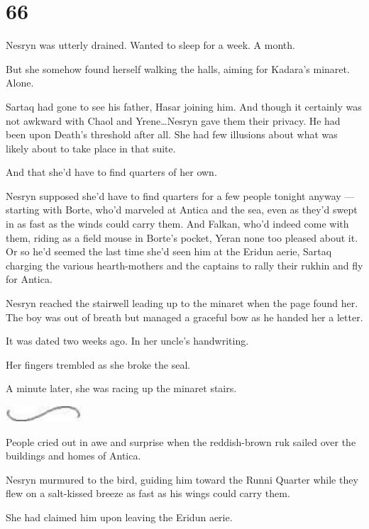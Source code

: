 
\chapter{66}

Nesryn was utterly drained.
Wanted to sleep for a week.
A month.

But she somehow found herself walking the halls, aiming for Kadara's minaret.
Alone.

Sartaq had gone to see his father, Hasar joining him.
And though it certainly was not awkward with Chaol and Yrene\ldots Nesryn gave them their privacy.
He had been upon Death's threshold after all.
She had few illusions about what was likely about to take place in that suite.

And that she'd have to find quarters of her own.

Nesryn supposed she'd have to find quarters for a few people tonight anyway ---starting with Borte, who'd marveled at Antica and the sea, even as they'd swept in as fast as the winds could carry them.
And Falkan, who'd indeed come with them, riding as a field mouse in Borte's pocket, Yeran none too pleased about it.
Or so he'd seemed the last time she'd seen him at the Eridun aerie, Sartaq charging the various hearth-mothers and the captains to rally their rukhin and fly for Antica.

Nesryn reached the stairwell leading up to the minaret when the page found her.
The boy was out of breath but managed a graceful bow as he handed her a letter.

It was dated two weeks ago.
In her uncle's handwriting.

Her fingers trembled as she broke the seal.

A minute later, she was racing up the minaret stairs.

\begin{center}
	\includegraphics[width=1.12in,height=0.24in]{images/seperator}
\end{center}

People cried out in awe and surprise when the reddish-brown ruk sailed over the buildings and homes of Antica.

Nesryn murmured to the bird, guiding him toward the Runni Quarter while they flew on a salt-kissed breeze as fast as his wings could carry them.

She had claimed him upon leaving the Eridun aerie.

